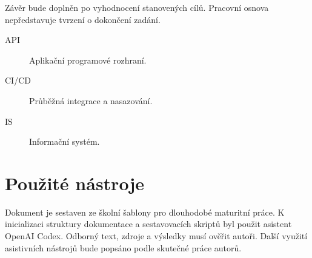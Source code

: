 Závěr bude doplněn po vyhodnocení stanovených cílů. Pracovní osnova
nepředstavuje tvrzení o dokončení zadání.

\printbibliography[heading=bibintoc]
\begin{description}
  \item[API] Aplikační programové rozhraní.
  \item[CI/CD] Průběžná integrace a nasazování.
  \item[IS] Informační systém.
\end{description}

\StartAppendices
\chapter{Použité nástroje}
Dokument je sestaven ze školní šablony pro dlouhodobé maturitní práce.
K inicializaci struktury dokumentace a sestavovacích skriptů byl použit
asistent OpenAI Codex. Odborný text, zdroje a výsledky musí ověřit autoři.
Další využití asistivních nástrojů bude popsáno podle skutečné práce autorů.

